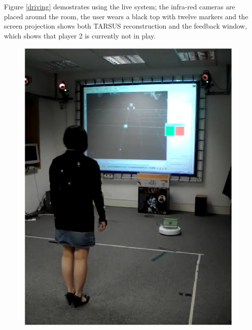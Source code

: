 \documentclass[12pt,a4,notitlepage]{report}
\renewcommand{\_}{\texttt{\symbol{95}}}
\newcommand{\<}{\texttt{\symbol{60}}}
\renewcommand{\>}{\texttt{\symbol{62}}}
\begin{document}
Figure \ref{driving} demostrates using the live system; the infra-red cameras are placed around the room, the user wears a black top with twelve markers and the screen projection shows both TARSUS reconstruction and the feedback window, which shows that player 2 is currently not in play.
\begin{figure}
\centering
\includegraphics[scale=0.15,angle=0]{images/live1.ps}

\end{figure}
\end{document}
